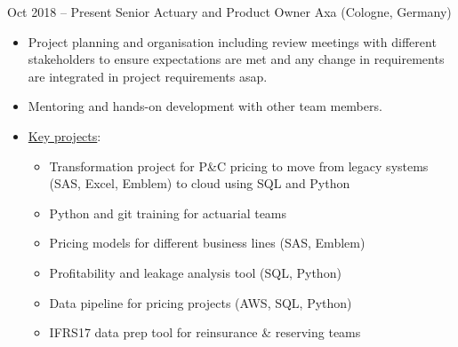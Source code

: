 \documentclass[a4paper,]{fortysecondscv}
\begin{document}
	\begin{cvtable}%

        \vspace{\topsep}
		\cvitem
			{Oct 2018 -- Present}
			{Senior Actuary and Product Owner}
			{Axa (Cologne, Germany)}
			{
				\vspace{-\topsep}
				\begin{itemize}[nosep, leftmargin=0pt] %
					\item Project planning and organisation including review meetings with different stakeholders to ensure expectations are met and any change in requirements are integrated in project requirements asap.
					\item Mentoring and hands-on development with other team members.
                    \item \underline{Key projects}:
					\begin{itemize}
                        \item Transformation project for P\&C pricing to move from legacy systems (SAS, Excel, Emblem) to cloud using SQL and Python
                        \item Python and git training for actuarial teams
                        \item Pricing models for different business lines (SAS, Emblem)
                        \item Profitability and leakage analysis tool (SQL, Python)
                        \item Data pipeline for pricing projects (AWS, SQL, Python)
                        \item IFRS17 data prep tool for reinsurance \& reserving teams
                    \end{itemize}
				\end{itemize}
			}

\end{cvtable}
\end{document}
